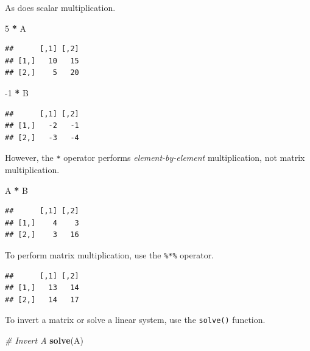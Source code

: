 \documentclass[12pt,oneside,openany]{book}
\newenvironment{Shaded}{\begin{snugshade}}{\end{snugshade}}
\newcommand{\KeywordTok}[1]{\textcolor[rgb]{0.13,0.29,0.53}{\textbf{#1}}}
\newcommand{\DecValTok}[1]{\textcolor[rgb]{0.00,0.00,0.81}{#1}}
\newcommand{\StringTok}[1]{\textcolor[rgb]{0.31,0.60,0.02}{#1}}
\newcommand{\CommentTok}[1]{\textcolor[rgb]{0.56,0.35,0.01}{\textit{#1}}}
\newcommand{\OperatorTok}[1]{\textcolor[rgb]{0.81,0.36,0.00}{\textbf{#1}}}
\newcommand{\NormalTok}[1]{#1}
\begin{document}
As does scalar multiplication.

\begin{Shaded}
\begin{Highlighting}[]
\DecValTok{5} \OperatorTok{*}\StringTok{ }\NormalTok{A}
\end{Highlighting}
\end{Shaded}

\begin{verbatim}
##      [,1] [,2]
## [1,]   10   15
## [2,]    5   20
\end{verbatim}

\begin{Shaded}
\begin{Highlighting}[]
\DecValTok{-1} \OperatorTok{*}\StringTok{ }\NormalTok{B}
\end{Highlighting}
\end{Shaded}

\begin{verbatim}
##      [,1] [,2]
## [1,]   -2   -1
## [2,]   -3   -4
\end{verbatim}

However, the \texttt{*} operator performs \emph{element-by-element}
multiplication, not matrix multiplication.

\begin{Shaded}
\begin{Highlighting}[]
\NormalTok{A }\OperatorTok{*}\StringTok{ }\NormalTok{B}
\end{Highlighting}
\end{Shaded}

\begin{verbatim}
##      [,1] [,2]
## [1,]    4    3
## [2,]    3   16
\end{verbatim}

To perform matrix multiplication, use the \texttt{\%*\%} operator.

\begin{Shaded}
\end{Shaded}

\begin{verbatim}
##      [,1] [,2]
## [1,]   13   14
## [2,]   14   17
\end{verbatim}

To invert a matrix or solve a linear system, use the \texttt{solve()}
function.

\begin{Shaded}
\begin{Highlighting}[]
\CommentTok{# Invert A}
\KeywordTok{solve}\NormalTok{(A)}
\end{Highlighting}
\end{Shaded}
\end{document}

